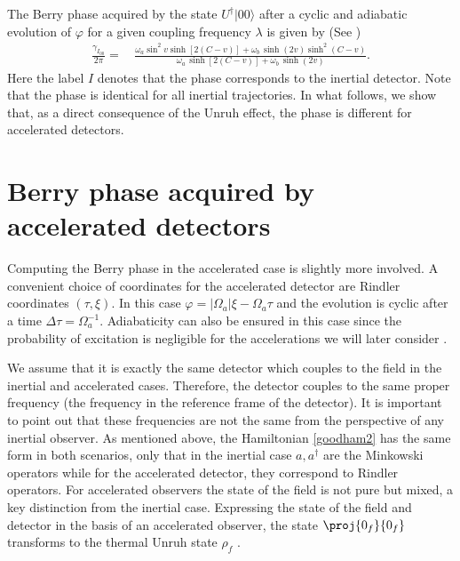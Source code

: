 The Berry phase acquired by the state $U^\dagger|00\rangle$ after a cyclic and adiabatic evolution of $\varphi$ for a given coupling frequency $\lambda$ is given by (See \cite{Berryoriginal})
\begin{align}
\frac{\gamma_{I_{00}}}{2\pi}=&\,\frac{\omega_a \sin^2 v \sinh [2(C-v)]+\omega_b\,\sinh(2v)\sinh^2 (C-v)}{\omega_a\, \sinh[2(C-v)]+\omega_b\,\sinh (2v)}.
\end{align}
Here the label $I$ denotes that the phase corresponds to the inertial detector. Note that the phase is identical for all inertial trajectories.  In what follows, we  show that, as a direct consequence of the Unruh effect, the phase is different for accelerated detectors. 


\section{Berry phase acquired by accelerated detectors}


Computing the Berry phase in the accelerated case is slightly more involved.  A convenient choice of coordinates for the accelerated detector are Rindler coordinates $(\tau,\xi)$. In this case $\varphi=|\Omega_a|\xi-\Omega_a\tau$ and the evolution is cyclic after a time $\Delta \tau = \Omega_a^{-1}$.  Adiabaticity can also be ensured in this case since the probability of excitation is negligible for the accelerations we will later consider \cite{Scully,Crispino}.  

 We assume that it is exactly the same detector which couples to the field in the inertial and accelerated cases. Therefore, the detector couples to the same proper frequency (the frequency in the reference frame of the detector). It is important to point out that these frequencies are not the same from the perspective of any inertial observer. As mentioned above, the Hamiltonian \eqref{goodham2} has the same form in both scenarios, only that in the inertial case $a,a^\dagger$ are the Minkowski operators while for the accelerated detector, they correspond to Rindler operators.  For accelerated observers  the state of the field is not pure but mixed, a key distinction from  the inertial case.   Expressing the state of the field and  detector  in the basis of an accelerated observer, the state $\proj{0_f}{0_f}$ transforms  to  the thermal Unruh state $\rho_f$ \cite{Unruh0,Alicefalls}. 
 
